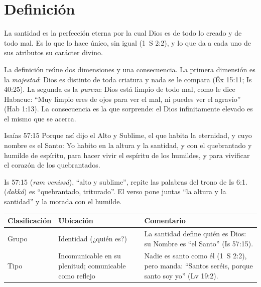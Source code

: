 \section{Definición}

\begin{tcolorbox}[colback=papiro,colframe=azul,boxrule=1pt,arc=3pt,fonttitle=\bfseries,title=La santidad de Dios]
La santidad es la perfección eterna por la cual Dios es  de todo lo creado y  de todo mal. Es lo que lo hace único, sin igual (1~S 2:2), y lo que da a cada uno de sus atributos su carácter divino.
\end{tcolorbox}

La definición reúne dos dimensiones y una consecuencia. La primera dimensión es la \emph{majestad}: Dios es distinto de toda criatura y nada se le compara (Éx 15:11; Is 40:25). La segunda es la \emph{pureza}: Dios está limpio de todo mal, como le dice Habacuc: ``Muy limpio eres de ojos para ver el mal, ni puedes ver el agravio'' (Hab 1:13). La consecuencia es la que sorprende: el Dios infinitamente elevado es el mismo que se acerca.

\begin{verso}{Isaías 57:15}
Porque así dijo el Alto y Sublime, el que habita la eternidad, y cuyo nombre es el Santo: Yo habito en la altura y la santidad, y con el quebrantado y humilde de espíritu, para hacer vivir el espíritu de los humildes, y para vivificar el corazón de los quebrantados.
\end{verso}

\begin{filologiatexto}{Is 57:15}
 (\emph{ram venissá}), ``alto y sublime'', repite las palabras del trono de Is 6:1.  (\emph{dakká}) es ``quebrantado, triturado''. El verso pone juntas ``la altura y la santidad'' y la morada con el humilde.
\end{filologiatexto}

\begin{center}\small\renewcommand{\arraystretch}{1.3}
\begin{tabular}{@{}L{3.6cm}L{5.4cm}L{5.4cm}@{}}
\toprule
\textbf{Clasificación} & \textbf{Ubicación} & \textbf{Comentario} \\ \midrule
Grupo & Identidad (¿quién es?) & La santidad define quién es Dios: su Nombre es ``el Santo'' (Is 57:15). \\
Tipo & Incomunicable en su plenitud; comunicable como reflejo & Nadie es santo como él (1~S 2:2), pero manda: ``Santos seréis, porque santo soy yo'' (Lv 19:2). \\
\bottomrule
\end{tabular}\end{center}

